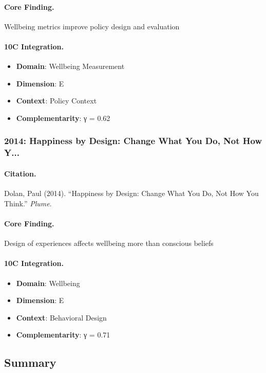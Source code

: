 \paragraph{Core Finding.}
Wellbeing metrics improve policy design and evaluation

\paragraph{10C Integration.}
\begin{itemize}[nosep]
  \item \textbf{Domain}: Wellbeing Measurement
  \item \textbf{Dimension}: E
  \item \textbf{Context}: Policy Context
  \item \textbf{Complementarity}: γ = 0.62
\end{itemize}

\subsubsection{2014: Happiness by Design: Change What You Do, Not How Y...}

\paragraph{Citation.}
Dolan, Paul (2014). ``Happiness by Design: Change What You Do, Not How You Think.''
\textit{Plume}.

\paragraph{Core Finding.}
Design of experiences affects wellbeing more than conscious beliefs

\paragraph{10C Integration.}
\begin{itemize}[nosep]
  \item \textbf{Domain}: Wellbeing
  \item \textbf{Dimension}: E
  \item \textbf{Context}: Behavioral Design
  \item \textbf{Complementarity}: γ = 0.71
\end{itemize}

\subsection{Summary}

